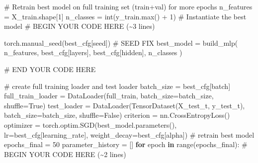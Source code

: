 \documentclass[
  letterpaper,
  DIV=11,
  numbers=noendperiod]{scrartcl}
\newenvironment{Shaded}{\begin{snugshade}}{\end{snugshade}}
\newcommand{\BuiltInTok}[1]{\textcolor[rgb]{0.00,0.23,0.31}{#1}}
\newcommand{\CommentTok}[1]{\textcolor[rgb]{0.37,0.37,0.37}{#1}}
\newcommand{\ControlFlowTok}[1]{\textcolor[rgb]{0.00,0.23,0.31}{\textbf{#1}}}
\newcommand{\DecValTok}[1]{\textcolor[rgb]{0.68,0.00,0.00}{#1}}
\newcommand{\KeywordTok}[1]{\textcolor[rgb]{0.00,0.23,0.31}{\textbf{#1}}}
\newcommand{\NormalTok}[1]{\textcolor[rgb]{0.00,0.23,0.31}{#1}}
\newcommand{\OperatorTok}[1]{\textcolor[rgb]{0.37,0.37,0.37}{#1}}
\newcommand{\RegionMarkerTok}[1]{\textcolor[rgb]{0.00,0.23,0.31}{#1}}
\newcommand{\StringTok}[1]{\textcolor[rgb]{0.13,0.47,0.30}{#1}}
\newcommand{\VariableTok}[1]{\textcolor[rgb]{0.07,0.07,0.07}{#1}}
\begin{document}
\begin{Shaded}
\begin{Highlighting}[]

\CommentTok{\# Retrain best model on full training set (train+val) for more epochs}
\NormalTok{n\_features }\OperatorTok{=}\NormalTok{ X\_train.shape[}\DecValTok{1}\NormalTok{]}
\NormalTok{n\_classes }\OperatorTok{=} \BuiltInTok{int}\NormalTok{(y\_train.}\BuiltInTok{max}\NormalTok{() }\OperatorTok{+} \DecValTok{1}\NormalTok{)}
\CommentTok{\# Instantiate the best model}
\CommentTok{\# }\RegionMarkerTok{BEGIN}\CommentTok{ YOUR CODE HERE (\textasciitilde{}3 lines)}


\NormalTok{torch.manual\_seed(best\_cfg[}\StringTok{\textquotesingle{}seed\textquotesingle{}}\NormalTok{]) }\CommentTok{\# SEED FIX}
\NormalTok{best\_model }\OperatorTok{=}\NormalTok{ build\_mlp(}
\NormalTok{    n\_features,}
\NormalTok{    best\_cfg[}\StringTok{\textquotesingle{}layers\textquotesingle{}}\NormalTok{],}
\NormalTok{    best\_cfg[}\StringTok{\textquotesingle{}hidden\textquotesingle{}}\NormalTok{],}
\NormalTok{    n\_classes}
\NormalTok{)}



\CommentTok{\# }\RegionMarkerTok{END}\CommentTok{ YOUR CODE HERE}

\CommentTok{\# create full training loader and test loader}
\NormalTok{batch\_size }\OperatorTok{=}\NormalTok{ best\_cfg[}\StringTok{\textquotesingle{}batch\textquotesingle{}}\NormalTok{]}
\NormalTok{full\_train\_loader }\OperatorTok{=}\NormalTok{ DataLoader(full\_train, batch\_size}\OperatorTok{=}\NormalTok{batch\_size, shuffle}\OperatorTok{=}\VariableTok{True}\NormalTok{)}
\NormalTok{test\_loader }\OperatorTok{=}\NormalTok{ DataLoader(TensorDataset(X\_test\_t, y\_test\_t), batch\_size}\OperatorTok{=}\NormalTok{batch\_size, shuffle}\OperatorTok{=}\VariableTok{False}\NormalTok{)}
\NormalTok{criterion }\OperatorTok{=}\NormalTok{ nn.CrossEntropyLoss()}
\NormalTok{optimizer }\OperatorTok{=}\NormalTok{ torch.optim.SGD(best\_model.parameters(),}
\NormalTok{                          lr}\OperatorTok{=}\NormalTok{best\_cfg[}\StringTok{\textquotesingle{}learning\_rate\textquotesingle{}}\NormalTok{],}
\NormalTok{                          weight\_decay}\OperatorTok{=}\NormalTok{best\_cfg[}\StringTok{\textquotesingle{}alpha\textquotesingle{}}\NormalTok{])}
\CommentTok{\# retrain best model}
\NormalTok{epochs\_final }\OperatorTok{=} \DecValTok{50}
\NormalTok{parameter\_history }\OperatorTok{=}\NormalTok{ []}
\ControlFlowTok{for}\NormalTok{ epoch }\KeywordTok{in} \BuiltInTok{range}\NormalTok{(epochs\_final):}
    \CommentTok{\# }\RegionMarkerTok{BEGIN}\CommentTok{ YOUR CODE HERE (\textasciitilde{}2 lines)}


\end{Highlighting}
\end{Shaded}
\end{document}
